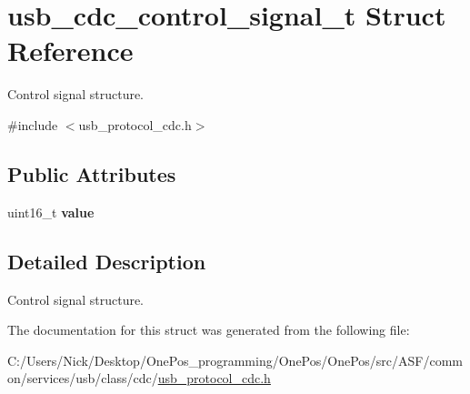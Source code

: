\hypertarget{structusb__cdc__control__signal__t}{\section{usb\-\_\-cdc\-\_\-control\-\_\-signal\-\_\-t Struct Reference}
\label{structusb__cdc__control__signal__t}
}


Control signal structure.  




{\ttfamily \#include $<$usb\-\_\-protocol\-\_\-cdc.\-h$>$}

\subsection*{Public Attributes}
\begin{DoxyCompactItemize}
\item 
\hypertarget{structusb__cdc__control__signal__t_a31c0208763a9d48548785c734f04b097}{uint16\-\_\-t {\bfseries value}}\label{structusb__cdc__control__signal__t_a31c0208763a9d48548785c734f04b097}

\end{DoxyCompactItemize}


\subsection{Detailed Description}
Control signal structure. 

The documentation for this struct was generated from the following file\-:\begin{DoxyCompactItemize}
\item 
C\-:/\-Users/\-Nick/\-Desktop/\-One\-Pos\-\_\-programming/\-One\-Pos/\-One\-Pos/src/\-A\-S\-F/common/services/usb/class/cdc/\hyperlink{usb__protocol__cdc_8h}{usb\-\_\-protocol\-\_\-cdc.\-h}\end{DoxyCompactItemize}
